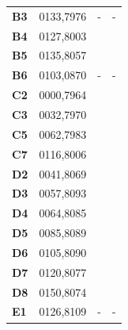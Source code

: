 \documentclass{article}
\begin{document}
\begin{CJK*}{UTF8}{bkai}
\begin{multicols}{2}
\begin{tabular}{|l|c|c|l|}
	\hline
	\textbf{B3}&0133,7976&-&-\\
	\textbf{B4}&0127,8003& &\\
	\textbf{B5}&0135,8057& &\\
	\textbf{B6}&0103,0870&-&-\\
	\hline
	\textbf{C2}&0000,7964& &\\
	\textbf{C3}&0032,7970& &\\
	\textbf{C5}&0062,7983& &\\
	\textbf{C7}&0116,8006& &\\
	\hline
	\textbf{D2}&0041,8069& &\\
	\textbf{D3}&0057,8093& &\\
	\textbf{D4}&0064,8085& &\\
	\textbf{D5}&0085,8089& &\\
	\textbf{D6}&0105,8090& &\\
	\textbf{D7}&0120,8077& &\\
	\textbf{D8}&0150,8074& &\\
	\hline
	\textbf{E1}&0126,8109&-&-\\
	\hline
\end{tabular}
\cleardoublepage


\end{multicols}
\end{CJK*}
\end{document}

